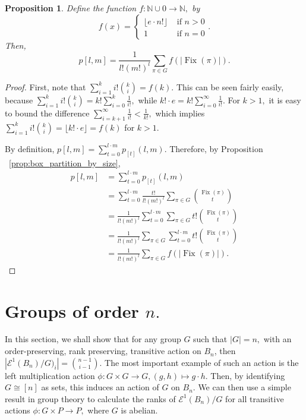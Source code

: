 \documentclass[10 pt]{amsart}
\theoremstyle{plain}
\newtheorem{prop}[thm]{Proposition}
\theoremstyle{definition}
\theoremstyle{remark}
\numberwithin{equation}{section}
\newcommand\BN{{\mathbb N}}
\def\Fix{\operatorname{Fix}}
\begin{document}
\begin{prop}
\label{prop:all_box_partitions}
Define the function $f:\BN \cup 0 \rightarrow \BN,$ by $$f(x) = \begin{cases} \lfloor e\cdot n!\rfloor &\text{ if } n > 0 \\ 1 &\text{ if } n = 0\end{cases}.$$
Then, $$p[l,m] = \frac 1 {l!(m!)^l}\sum_{\pi \in G} f(|\Fix(\pi)|).$$
\end{prop}
\begin{proof}
First, note that $\sum_{i=1}^k i! \binom k i = f(k).$ This can be seen fairly easily, because $\sum_{i=1}^k i! \binom k i = k!\sum_{i=0}^k \frac 1 {i!},$ while $k! \cdot e = k!\sum_{i=0}^\infty \frac 1 {i!}.$ For $k > 1,$ it is easy to bound the difference $\sum_{i=k+1}^\infty \frac 1 {i!} < \frac 1 {k!},$ which implies   $\sum_{i=1}^k i! \binom k i  = \lfloor k! \cdot e \rfloor = f(k)$ for $k > 1.$

By definition, $p[l,m] = \sum_{t = 0}^{l\cdot m} p_{[t]}(l,m)$. Therefore, by Proposition ~\ref{prop:box_partition_by_size},
\begin{align*}
p[l,m] &= \sum_{t = 0}^{l\cdot m} p_{[t]}(l,m)\\
&=\sum_{t = 0}^{l\cdot m}\frac {t!}{l!(m!)^l}\sum_{\pi \in G} \binom {\Fix(\pi)} t\\
&= \frac {1}{l!(m!)^l}\sum_{t = 0}^{l\cdot m}\sum_{\pi \in G} t!\binom {\Fix(\pi)} t\\
&=  \frac {1}{l!(m!)^l}\sum_{\pi \in G}\sum_{t = 0}^{l\cdot m} t!\binom {\Fix(\pi)} t\\
&= \frac {1}{l!(m!)^l}\sum_{\pi \in G} f(|\Fix(\pi)|).
\end{align*}
\end{proof}




\section{Groups of order $n.$}

In this section, we shall show that for any group $G$ such that $|G| = n,$ with an order-preserving, rank preserving, transitive action on $B_n$, then $|\mathcal E^1(B_n)/G)_i| = \binom {n-1}{i-1}.$ The most important example of such an action is the left multiplication action $\phi: G\times G \rightarrow G,(g,h)\mapsto g \cdot h.$ Then, by identifying $G \cong [n]$ as sets, this induces an action of $G$ on $B_n.$ We can then use a simple result in group theory to calculate the ranks of $\mathcal E^1(B_n)/G$ for all transitive actions $\phi:G\times P \rightarrow P,$ where $G$ is abelian.
\end{document}
